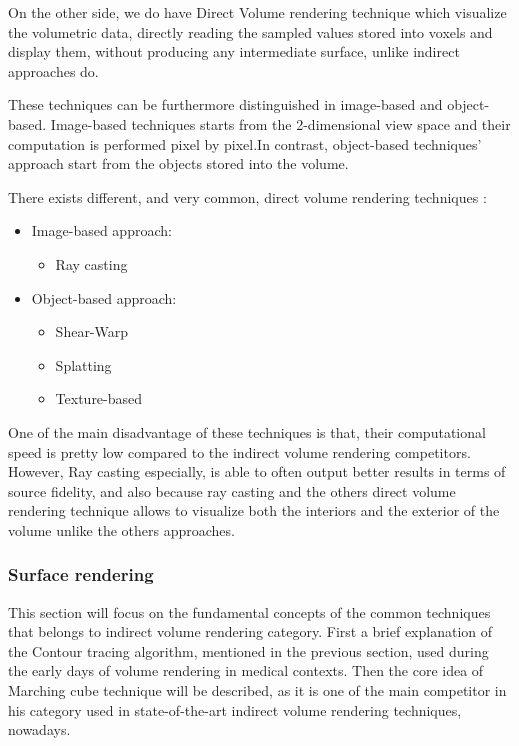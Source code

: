 \documentclass[12pt,a4paper]{extarticle}
\newcommand{\linespace}{\vspace{8pt}}
\begin{document}
On the other side, we do have Direct Volume rendering technique which visualize the volumetric data, directly reading the sampled values stored into voxels and display them, without producing any intermediate surface, unlike indirect approaches do. 
\linespace

These techniques can be furthermore distinguished in image-based and object-based. Image-based techniques starts from the 2-dimensional view space and their computation is performed pixel by pixel.In contrast, object-based techniques' approach start from the objects stored into the volume. 

There exists different, and very common, direct volume rendering techniques :
\begin{itemize}
\item Image-based approach:
\begin{itemize}
\item Ray casting
\end{itemize}
\item Object-based approach:
\begin{itemize}
\item Shear-Warp
\item Splatting
\item Texture-based
\end{itemize}
\end{itemize}

One of the main disadvantage of these techniques is that, their computational speed is pretty low compared to the indirect volume rendering competitors. However, Ray casting especially, is able to often output better results in terms of source fidelity, and also because ray casting and the others direct volume rendering technique allows to visualize both the interiors and the exterior of the volume unlike the others approaches.

\subsubsection{Surface rendering} %
This section will focus on the fundamental concepts of the common techniques that belongs to indirect volume rendering category. First a brief explanation of the Contour tracing algorithm, mentioned in the previous section, used during the early days of volume rendering in medical contexts. Then the core idea of Marching cube technique will be described, as it is one of the main competitor in his category used in state-of-the-art indirect volume rendering techniques, nowadays.
\end{document}
